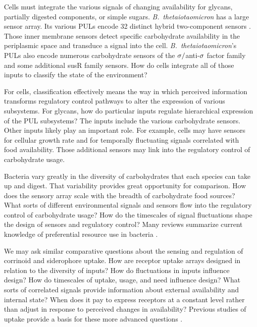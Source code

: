 \documentclass[\mydocfontsize]{article}
\begin{document}
\begin{multicols}{2}
Cells must integrate the various signals of changing availability for glycans, partially digested components, or simple sugars. \textit{B.\ thetaiotaomicron} has a large sensor array. Its various PULs encode 32 distinct hybrid two-component sensors \autocite{sonnenburg06a-hybrid}. Those inner membrane sensors detect specific carbohydrate availability in the periplasmic space and transduce a signal into the cell. \textit{B.\ thetaiotaomicron}'s PULs also encode numerous carbohydrate sensors of the $\sigma/$anti-$\sigma$ factor family and some additional susR family sensors. How do cells integrate all of those inputs to classify the state of the environment?

For cells, classification effectively means the way in which perceived information transforms regulatory control pathways to alter the expression of various subsystems. For glycans, how do particular inputs regulate hierarchical expression of the PUL subsystems? The inputs include the various carbohydrate sensors. Other inputs likely play an important role. For example, cells may have sensors for cellular growth rate and for temporally fluctuating signals correlated with food availability. Those additional sensors may link into the regulatory control of carbohydrate usage.

Bacteria vary greatly in the diversity of carbohydrates that each species can take up and digest. That variability provides great opportunity for comparison. How does the sensory array scale with the breadth of carbohydrate food sources? What sorts of different environmental signals and sensors flow into the regulatory control of carbohydrate usage? How do the timescales of signal fluctuations shape the design of sensors and regulatory control? Many reviews summarize current knowledge of preferential resource use in bacteria \autocite{deutscher08the-mechanisms,gorke08carbon,chubukov14coordination,beisel16rethinking}.

We may ask similar comparative questions about the sensing and regulation of corrinoid and siderophore uptake. How are receptor uptake arrays designed in relation to the diversity of inputs? How do fluctuations in inputs influence design? How do timescales of uptake, usage, and need influence design? What sorts of correlated signals provide information about external availability and internal state? When does it pay to express receptors at a constant level rather than adjust in response to perceived changes in availability? Previous studies of uptake provide a basis for these more advanced questions \autocite{degnan14human,schalk16an-overview}.


\end{multicols}
\end{document}
